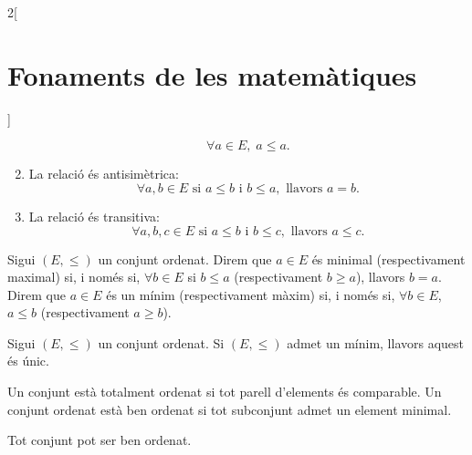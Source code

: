\documentclass[../../../main.tex]{subfiles}
\begin{document}
\begin{multicols}{2}[\section{Fonaments de les matemàtiques}]
\begin{definition}
\begin{enumerate}
    $$\forall a\in E,\;a\leq a.$$
    \item La relació és antisimètrica:
    $$\forall a,b\in E\text{ si }a\leq b\text{ i }b\leq a,\text{ llavors }a=b.$$
    \item La relació és transitiva:
    $$\forall a,b,c\in E\text{ si }a\leq b\text{ i }b\leq c,\text{ llavors }a\leq c.$$
\end{enumerate}
\end{definition}
\begin{definition}
Sigui $(E,\leq)$ un conjunt ordenat. Direm que $a\in E$ és minimal (respectivament maximal) si, i només si, $\forall b\in E$ si $b\leq a$ (respectivament $b\geq a$), llavors $b=a$. Direm que $a\in E$ és un mínim (respectivament màxim) si, i només si, $\forall b\in E$, $a\leq b$ (respectivament $a\geq b$).
\end{definition}
\begin{lemma}
Sigui $(E,\leq)$ un conjunt ordenat. Si $(E,\leq)$ admet un mínim, llavors aquest és únic.
\end{lemma}
\begin{definition}
Un conjunt està totalment ordenat si tot parell d'elements és comparable. Un conjunt ordenat està ben ordenat si tot subconjunt admet un element minimal.
\end{definition}
\begin{theorem}
Tot conjunt pot ser ben ordenat.
\end{theorem}

\end{multicols}
\end{document}
